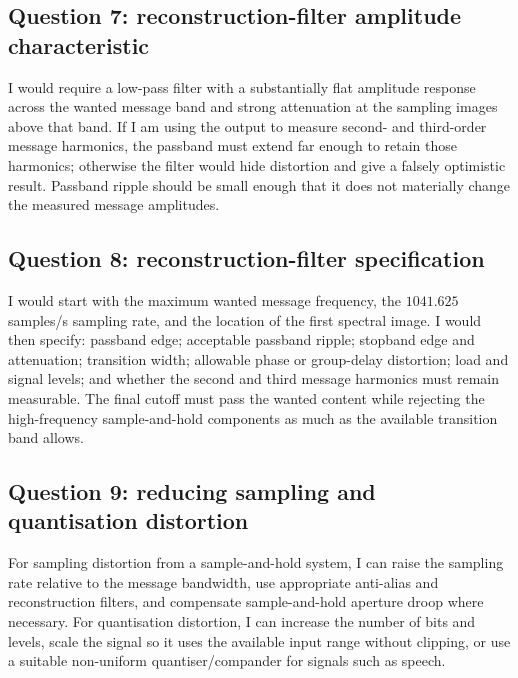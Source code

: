 \documentclass[11pt,a4paper]{article}
\begin{document}
\subsection{Question 7: reconstruction-filter amplitude characteristic}
\begin{answerbox}
I would require a low-pass filter with a substantially flat amplitude response across the wanted message band and strong attenuation at the sampling images above that band. If I am using the output to measure second- and third-order message harmonics, the passband must extend far enough to retain those harmonics; otherwise the filter would hide distortion and give a falsely optimistic result. Passband ripple should be small enough that it does not materially change the measured message amplitudes.
\end{answerbox}

\subsection{Question 8: reconstruction-filter specification}
\begin{answerbox}
I would start with the maximum wanted message frequency, the $1041.625$ samples/s sampling rate, and the location of the first spectral image. I would then specify: passband edge; acceptable passband ripple; stopband edge and attenuation; transition width; allowable phase or group-delay distortion; load and signal levels; and whether the second and third message harmonics must remain measurable. The final cutoff must pass the wanted content while rejecting the high-frequency sample-and-hold components as much as the available transition band allows.
\end{answerbox}

\subsection{Question 9: reducing sampling and quantisation distortion}
\begin{answerbox}
For sampling distortion from a sample-and-hold system, I can raise the sampling rate relative to the message bandwidth, use appropriate anti-alias and reconstruction filters, and compensate sample-and-hold aperture droop where necessary. For quantisation distortion, I can increase the number of bits and levels, scale the signal so it uses the available input range without clipping, or use a suitable non-uniform quantiser/compander for signals such as speech.
\end{answerbox}
\end{document}
